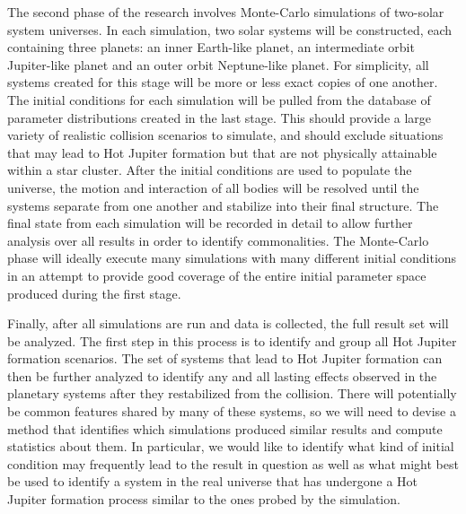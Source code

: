 \documentclass[12pt]{article}
\begin{document}
The second phase of the research involves Monte-Carlo simulations of
two-solar system universes. In each simulation, two solar systems will
be constructed, each containing three planets: an inner Earth-like planet, an
intermediate orbit Jupiter-like planet and an outer orbit Neptune-like planet.
For simplicity, all systems created for this stage will be more or less
exact copies of one another. The initial conditions for each simulation 
will be pulled from the database of parameter distributions created in the 
last stage. This should provide a large variety of realistic collision
scenarios to simulate, and should exclude situations that may lead to Hot Jupiter
formation but that are not physically attainable within a star cluster. 
After the initial conditions are used to 
populate the universe, the motion and interaction of all bodies will be
resolved until the systems separate from one another and stabilize 
into their final structure. The final state from each simulation will be
recorded in detail to allow further analysis over all results in order
to identify commonalities. The Monte-Carlo phase will ideally execute
many simulations with many different initial conditions 
in an attempt to provide good coverage of the entire initial
parameter space produced during the first stage.

Finally, after all simulations are run and data is collected, 
the full result set will be analyzed. The first step in this
process is to identify and group all Hot Jupiter formation scenarios.
The set of systems that lead to Hot Jupiter formation can then be
further analyzed to identify any and all lasting effects observed
in the planetary systems after they restabilized from the collision.
There will potentially be common features shared by many of these
systems, so we will need to devise a method that identifies which
simulations produced similar results and compute statistics about
them. In particular, we would like to identify what kind of initial 
condition may frequently lead to the result in question as well as
what might best be used to identify a system in the real universe
that has undergone a Hot Jupiter formation process similar to the
ones probed by the simulation.

\end{document}
